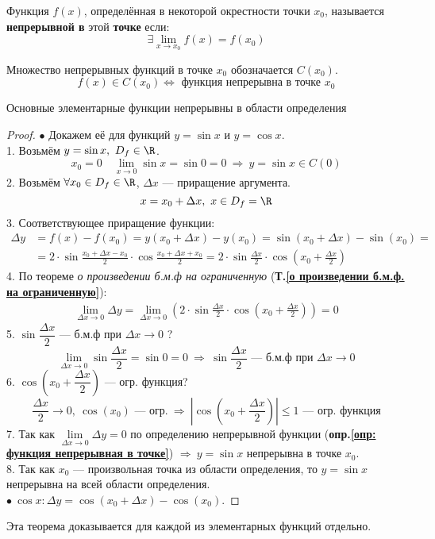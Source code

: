 \begin{definition}
  Функция $f(x)$, определённая в некоторой окрестности точки $x_0$, называется \textbf{непрерывной в} этой \textbf{точке} если: \[
    \exists \lim_{x \to x_0} f(x) = f(x_0)
  \]
\end{definition}
\begin{note}
  Множество непрерывных функций в точке $x_0$ обозначается $C(x_0)$. 
  \[
    f(x) \in C(x_0) \iff \text{ функция непрерывна в точке } x_0
  \] 
\end{note}
\begin{theorem}
  Основные элементарные функции непрерывны в области определения
\end{theorem}
\begin{proof}
  $\bullet$ Докажем её для функций $y = \sin x$ и $y=\cos x$. \\
  1. Возьмём $y = \sin x,\ D_f \in \R$.
  \[ x_0 = 0\quad \lim\limits_{x \to 0} \sin x = \sin 0 = 0\ \Rightarrow\ y= \sin x \in C(0) \]
  2. Возьмём $\forall x_0 \in D_f \in \R$, $\Delta x$ --- приращение аргумента.
  \[ x = x_0 + \Delta x ,\ x \in D_f = \R \]
  3. Соответствующее приращение функции:
  \begin{align*}
    \Delta y &= f(x) - f(x_0) = y(x_0 + \Delta x) - y(x_0) = \sin(x_0 + \Delta x) - \sin(x_0) = \\
    &= 2\cdot \sin \frac{x_0 + \Delta x - x_0}{2}\cdot \cos \frac{x_0 + \Delta x + x_0}{2} = 2\cdot \sin \frac{\Delta x}{2}\cdot \cos \left( x_0 + \frac{\Delta x}{2} \right)
  \end{align*}
  4. По теореме \textit{о произведении б.м.ф на ограниченную} (\textbf{Т.\ref{о произведении б.м.ф. на ограниченную}}):
  \begin{gather*}
    \lim\limits_{\Delta x \to 0} \Delta y = \lim\limits_{\Delta x \to 0} \left( 2\cdot \sin \frac{\Delta x}{2}\cdot \cos \left(x_0 + \frac{\Delta x}{2} \right) \right) = 0
  \end{gather*}
  5. $\sin \dfrac{\Delta x}{2}$ --- б.м.ф при $\Delta x \to 0$ ?
  \[ \lim\limits_{\Delta x \to 0} \sin \frac{\Delta x}{2} = \sin 0 = 0\ \Rightarrow\ \sin \frac{\Delta x}{2} \text{ --- б.м.ф при } \Delta x \to 0 \]
  6. $\cos \left( x_0 + \dfrac{\Delta x }{2} \right)$ --- огр. функция?
    \[ \frac{\Delta x}{2} \to 0,\ \cos(x_0) \text{ --- огр.}\ \Rightarrow\ \left| \cos \left( x_0 + \frac{\Delta x}{2} \right) \right| \le 1 \text{ --- огр. функция} \]
  7. Так как $\lim\limits_{\Delta x \to 0} \Delta y = 0$ по определению непрерывной функции (\textbf{опр.\ref{опр: функция непрерывная в точке}}) $\Rightarrow\ y = \sin x$ непрерывна в точке $x_0$. \\
  8. Так как $x_0$ --- произвольная точка из области определения, то $y = \sin x$ непрерывна на всей области определения. \\[1ex]
  $\bullet\  \cos x\colon \Delta y = \cos(x_0 + \Delta x) - \cos (x_0)$.
\end{proof}
\begin{remark}
  Эта теорема доказывается для каждой из элементарных функций отдельно.
\end{remark}
\newpage

